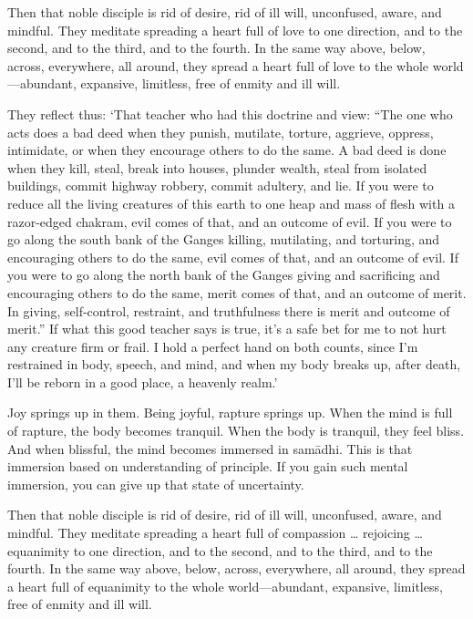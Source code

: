 \documentclass[12pt,openany]{book}%
\begin{document}
Then that noble disciple is rid of desire, rid of ill will, unconfused, aware, and mindful. They meditate spreading a heart full of love to one direction, and to the second, and to the third, and to the fourth. In the same way above, below, across, everywhere, all around, they spread a heart full of love to the whole world—abundant, expansive, limitless, free of enmity and ill will. 

They reflect thus: ‘That teacher who had this doctrine and view: “The one who acts does a bad deed when they punish, mutilate, torture, aggrieve, oppress, intimidate, or when they encourage others to do the same. A bad deed is done when they kill, steal, break into houses, plunder wealth, steal from isolated buildings, commit highway robbery, commit adultery, and lie. If you were to reduce all the living creatures of this earth to one heap and mass of flesh with a razor-edged chakram, evil comes of that, and an outcome of evil. If you were to go along the south bank of the Ganges killing, mutilating, and torturing, and encouraging others to do the same, evil comes of that, and an outcome of evil. If you were to go along the north bank of the Ganges giving and sacrificing and encouraging others to do the same, merit comes of that, and an outcome of merit. In giving, self-control, restraint, and truthfulness there is merit and outcome of merit.” If what this good teacher says is true, it’s a safe bet for me to not hurt any creature firm or frail. I hold a perfect hand on both counts, since I’m restrained in body, speech, and mind, and when my body breaks up, after death, I’ll be reborn in a good place, a heavenly realm.’ 

Joy springs up in them. Being joyful, rapture springs up. When the mind is full of rapture, the body becomes tranquil. When the body is tranquil, they feel bliss. And when blissful, the mind becomes immersed in \textsanskrit{samādhi}. This is that immersion based on understanding of principle. If you gain such mental immersion, you can give up that state of uncertainty. 

Then that noble disciple is rid of desire, rid of ill will, unconfused, aware, and mindful. They meditate spreading a heart full of compassion … rejoicing … equanimity to one direction, and to the second, and to the third, and to the fourth. In the same way above, below, across, everywhere, all around, they spread a heart full of equanimity to the whole world—abundant, expansive, limitless, free of enmity and ill will. 
\end{document}
